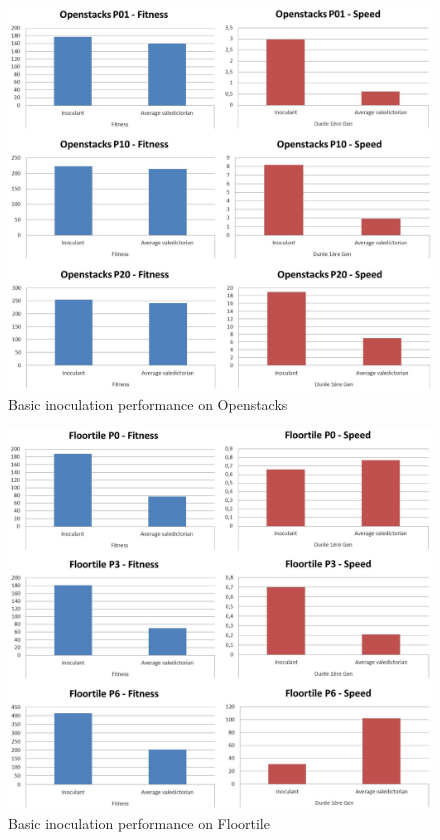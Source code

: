 \documentclass[english]{DESCARWINreport}
\newcommand{\OPENSTACKS}{{\sc Openstacks}}
\newcommand{\FLOORTILE}{{\sc Floortile}}
\begin{document}
\begin{figure}
	\centering
		\includegraphics[width=\textwidth]{pics/Openstacks.eps}
	\caption{Basic inoculation performance on \OPENSTACKS}
	\label{fig:adam_open}
\end{figure}


\begin{figure}
	\centering
		\includegraphics[width=\textwidth]{pics/Floortile.eps}
	\caption{Basic inoculation performance on \FLOORTILE}
	\label{fig:adam_floor}
\end{figure}
\end{document}
